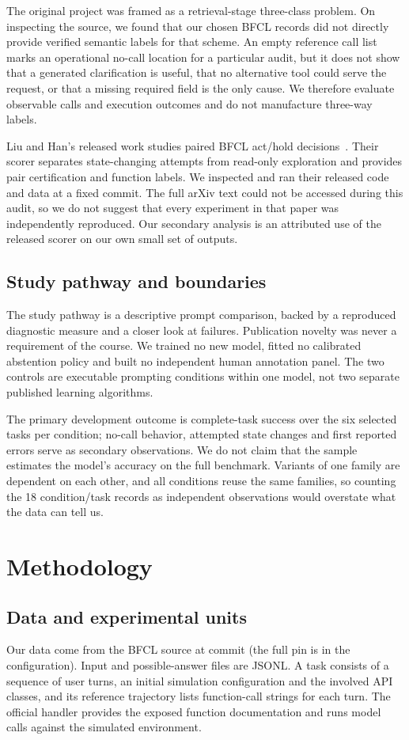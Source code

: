\documentclass[conference]{IEEEtran}
\newcommand{\code}[1]{\texttt{\detokenize{#1}}}
\begin{document}
The original project was framed as a retrieval-stage three-class problem. On inspecting the source, we found that our chosen BFCL records did not directly provide verified semantic labels for that scheme. An empty reference call list marks an operational no-call location for a particular audit, but it does not show that a generated clarification is useful, that no alternative tool could serve the request, or that a missing required field is the only cause. We therefore evaluate observable calls and execution outcomes and do not manufacture three-way labels.

Liu and Han's released work studies paired BFCL act/hold decisions~\cite{liu2026asking}. Their scorer separates state-changing attempts from read-only exploration and provides pair certification and function labels. We inspected and ran their released code and data at a fixed commit. The full arXiv text could not be accessed during this audit, so we do not suggest that every experiment in that paper was independently reproduced. Our secondary analysis is an attributed use of the released scorer on our own small set of outputs.

\subsection{Study pathway and boundaries}
The study pathway is a descriptive prompt comparison, backed by a reproduced diagnostic measure and a closer look at failures. Publication novelty was never a requirement of the course. We trained no new model, fitted no calibrated abstention policy and built no independent human annotation panel. The two controls are executable prompting conditions within one model, not two separate published learning algorithms.

The primary development outcome is complete-task success over the six selected tasks per condition; no-call behavior, attempted state changes and first reported errors serve as secondary observations. We do not claim that the sample estimates the model's accuracy on the full benchmark. Variants of one family are dependent on each other, and all conditions reuse the same families, so counting the 18 condition/task records as independent observations would overstate what the data can tell us.

\section{Methodology}
\subsection{Data and experimental units}
Our data come from the BFCL source at commit \code{6ea57973c7a6} (the full pin is in the configuration). Input and possible-answer files are JSONL. A task consists of a sequence of user turns, an initial simulation configuration and the involved API classes, and its reference trajectory lists function-call strings for each turn. The official handler provides the exposed function documentation and runs model calls against the simulated environment.
\end{document}
